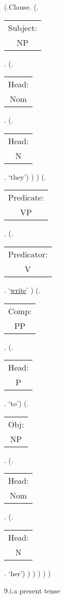 \documentclass[12pt,letterpaper]{article}
\begin{document}
\begin{figure}
	\begin{center}
		\begin{parsetree}
			(.Clause.
			(.\begin{tabular}{c}Subject:\\NP\end{tabular}.  
			(.\begin{tabular}{c}Head:\\Nom\end{tabular}.
			(.\begin{tabular}{c}Head:\\N\end{tabular}. `they')
			)
			)
			(.\begin{tabular}{c}Predicate:\\VP\end{tabular}.
			(.\begin{tabular}{c}Predicator:\\V\end{tabular}. `\underline{write}' )
			(.\begin{tabular}{c}Comp:\\PP\end{tabular}.
			(.\begin{tabular}{c}Head:\\P\end{tabular}. `to')
			(.\begin{tabular}{c}Obj:\\NP\end{tabular}. 
			(.\begin{tabular}{c}Head:\\Nom\end{tabular}. 
			(.\begin{tabular}{c}Head:\\N\end{tabular}. `her')
			)
			)
			)
			)
			)
			
			
		\end{parsetree}
		\hfill \break \hfill \break
		9.i.a present tense
	\end{center}
\end{figure}
\end{document}
